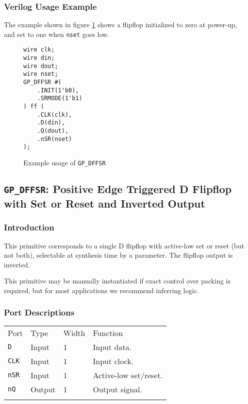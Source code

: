 \documentclass[11pt]{article}
\newcommand{\tokenstyle}[1]{\texttt{#1}}
\newcommand{\wirestyle}[1]{\texttt{#1}}
\newcommand{\whenstyle}[1]{{\fontseries{sb}\selectfont#1}}
\newcommand{\thinhline}{\Xhline{1\arrayrulewidth}}
\newcommand{\thickhline}{\Xhline{2.5\arrayrulewidth}}
\begin{document}
\subsubsection{Verilog Usage Example}

The example shown in figure \ref{gp-dffsr-example} shows a flipflop initialized to zero at power-up, and set to one
when \wirestyle{nset} goes low.

\begin{figure}[h]
\begin{lstlisting}
wire clk;
wire din;
wire dout;
wire nset;
GP_DFFSR #(
	.INIT(1'b0),
	.SRMODE(1'b1)
) ff (
	.CLK(clk),
	.D(din),
	.Q(dout),
	.nSR(nset)
);
\end{lstlisting}
\caption{Example usage of \tokenstyle{GP\_DFFSR}}
\label{gp-dffsr-example}
\end{figure}


\pagebreak
\subsection{\tokenstyle{GP\_DFFSR}: Positive Edge Triggered D Flipflop with Set or Reset and Inverted Output}
\label{gp-dffsr}

\subsubsection{Introduction}
This primitive corresponds to a single D flipflop with active-low set or reset (but not both), selectable at synthesis
time by a parameter. The flipflop output is inverted.

This primitive may be manually instantiated if exact control over packing is required, but for most applications we
recommend inferring logic.

\subsubsection{Port Descriptions}

\begin{tabularx}{\textwidth}{lllX}
\thinhline
\whenstyle{Port} & \whenstyle{Type} & \whenstyle{Width} & \whenstyle{Function} \\
\thickhline
\tokenstyle{D} & Input & 1 & Input data. \\
\thinhline
\tokenstyle{CLK} & Input & 1 & Input clock. \\
\thinhline
\tokenstyle{nSR} & Input & 1 & Active-low set/reset. \\
\thinhline
\tokenstyle{nQ} & Output & 1 & Output signal. \\
\thinhline
\end{tabularx}
\end{document}
